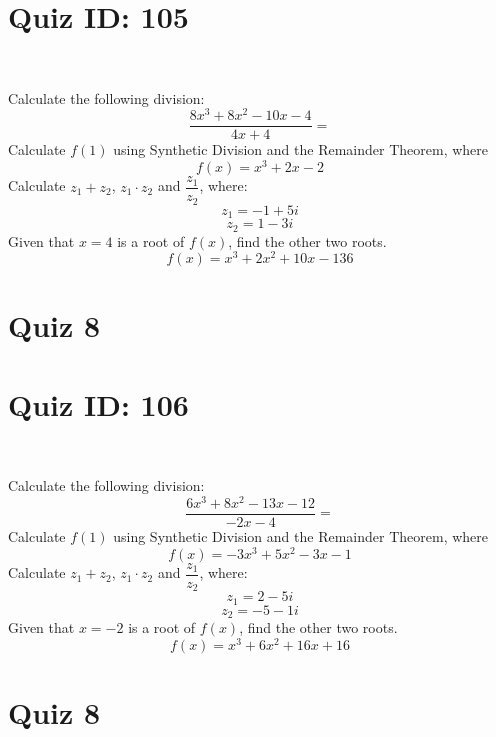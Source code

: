 \documentclass{exam}
\begin{document}
\section*{Quiz ID: 105}
\vspace{0.5cm}\
\vspace{1cm}\
\begin{questions}
\question Calculate the following division:\[\dfrac{
8x^3 + 8x^2 - 10x - 4}{
4x + 4}=\] \makeemptybox{\stretch{2}}
\question Calculate $f(1)$ using Synthetic Division and the Remainder Theorem, where\[f(x) = 
x^3 + 2x - 2\]
\newpage\question Calculate $z_1+z_2$, $z_1\cdot z_2$ and $\dfrac{z_1}{z_2}$, where:\[z_1=-1+5\mathit{i}\]\[z_2=1-3\mathit{i}\]
\question Given that $x=4$ is a root of $f(x)$, find the other two roots.\[f(x)=
x^3 + 2x^2 + 10x - 136\]\makeemptybox{\stretch{1}}
\end{questions}\newpage
\newpage
\section*{Quiz 8}
\section*{Quiz ID: 106}
\vspace{0.5cm}\
\vspace{1cm}\
\begin{questions}
\question Calculate the following division:\[\dfrac{
6x^3 + 8x^2 - 13x - 12}{
-2x - 4}=\] 
\question Calculate $f(1)$ using Synthetic Division and the Remainder Theorem, where\[f(x) = 
-3x^3 + 5x^2 - 3x - 1\]
\newpage\question Calculate $z_1+z_2$, $z_1\cdot z_2$ and $\dfrac{z_1}{z_2}$, where:\[z_1=2-5\mathit{i}\]\[z_2=-5-1\mathit{i}\]\makeemptybox{\stretch{1}}
\question Given that $x=-2$ is a root of $f(x)$, find the other two roots.\[f(x)=
x^3 + 6x^2 + 16x + 16\]\makeemptybox{\stretch{1}}
\end{questions}\newpage
\newpage
\section*{Quiz 8}
\end{document}
